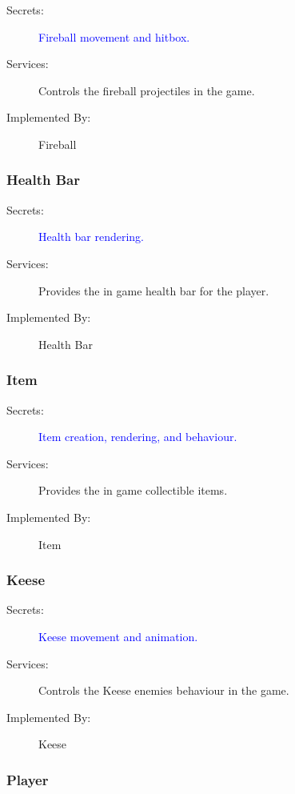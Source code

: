 \documentclass[12pt, titlepage]{article}
\begin{document}
\begin{description}
  \item[Secrets:] \textcolor{blue}{Fireball movement and hitbox.}
  \item[Services:] Controls the fireball projectiles in the game. 
  \item[Implemented By:] Fireball
\end{description}

\subsubsection{Health Bar}

\begin{description}
  \item[Secrets:] \textcolor{blue}{Health bar rendering.}
  \item[Services:] Provides the in game health bar for the player.
  \item[Implemented By:] Health Bar
\end{description}

\subsubsection{Item}

\begin{description}
  \item[Secrets:] \textcolor{blue}{Item creation, rendering, and behaviour.}
  \item[Services:] Provides the in game collectible items.
  \item[Implemented By:] Item
\end{description}

\subsubsection{Keese}

\begin{description}
  \item[Secrets:] \textcolor{blue}{Keese movement and animation.}
  \item[Services:] Controls the Keese enemies behaviour in the game.
  \item[Implemented By:] Keese
\end{description}

\subsubsection{Player}
\end{document}
